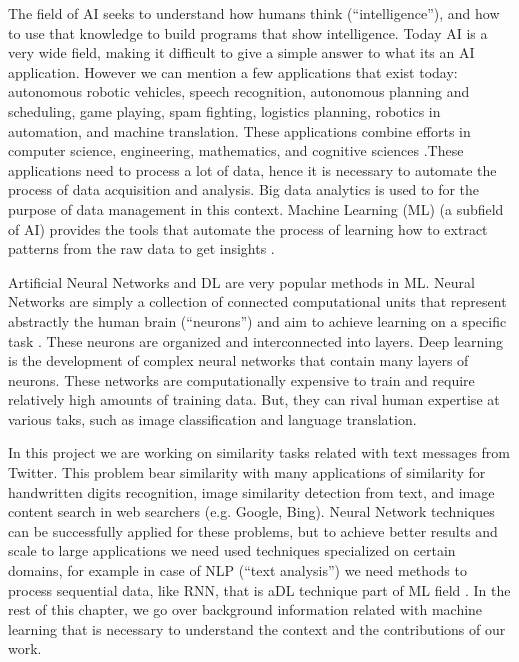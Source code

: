 \documentclass[12pt]{report}
\begin{document}
	The field of \ac{AI} seeks to understand how humans think (``intelligence''), and how to use that knowledge to build programs that show intelligence. 
	Today \ac{AI} is a very wide field, making it difficult to give a simple answer to what its an AI application. However we can mention a few applications that exist today:  autonomous robotic vehicles, speech recognition, autonomous planning and scheduling, game playing, spam fighting, logistics planning, robotics in 
	automation, and machine translation. These applications combine efforts in computer science, engineering, mathematics, and cognitive sciences \cite{Russell2010}.These applications need to process a lot of data, hence it is necessary to automate the process of data acquisition and analysis. 
	Big data analytics is used to for the purpose of data management in this context.  Machine Learning (\ac{ML})  (a subfield of \ac{AI}) provides the tools  that automate the process of learning  how to extract patterns from the raw data to get insights \cite{Kelleher2015}.
	
	Artificial Neural Networks and \ac{DL} are very popular methods in \ac{ML}. Neural Networks are simply a collection of connected computational 
	units that represent abstractly the human brain (“neurons”) and  aim to achieve learning on a specific task \cite{Russell2010}. These neurons are organized and interconnected into layers. Deep learning is the development of complex neural networks that contain many layers of neurons. These networks are computationally expensive to train and require relatively high amounts of training data. But, they can rival human expertise at various taks, such as image classification and language translation.  
	
	In this project we are working on similarity tasks related with text messages from Twitter. This problem bear similarity with many applications of similarity for handwritten digits recognition, image similarity detection from text, and image content search  in  web searchers (e.g. Google, Bing).  Neural Network techniques can be successfully applied for these problems, but to achieve better results and scale to large applications we need used techniques specialized on certain domains, for example in case of \ac{NLP} (``text analysis'') we need methods to process sequential data, like {RNN}, that is a{DL} technique part of {ML} field \cite{Goodfellow2016}.  In the rest of this chapter, we go over background information related with machine learning that is necessary to understand the context and the contributions of our work.
	
\end{document}
